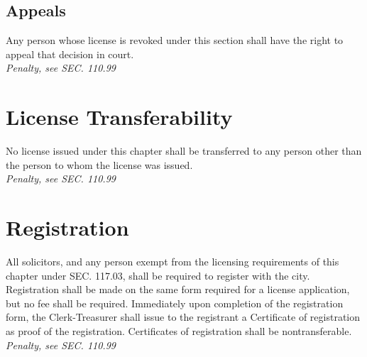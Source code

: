 \subsection{Appeals}
Any person whose license is revoked under this section shall have the right to appeal that decision in court.\\
\emph{Penalty, see SEC. 110.99}

\section{License Transferability}
No license issued under this chapter shall be transferred to any person other than the person to whom the license was issued.\\
\emph{Penalty, see SEC. 110.99}

\section{Registration}
All solicitors, and any person exempt from the licensing requirements of this chapter under SEC. 117.03, shall be required to register with the city. Registration shall be made on the same form required for a license application, but no fee shall be required. Immediately upon completion of the registration form, the Clerk-Treasurer shall issue to the registrant a Certificate of registration as proof of the registration. Certificates of registration shall be nontransferable.\\
\emph{Penalty, see SEC. 110.99}

